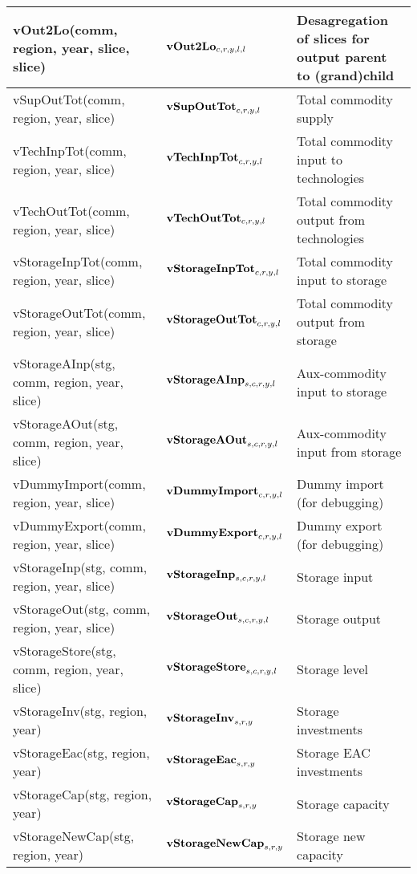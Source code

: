 \documentclass{article}
\begin{document}
\begin{longtable}{|p{10cm}|p{5cm}|p{9cm}|}
vOut2Lo(comm, region, year, slice, slice) & ${\bf vOut2Lo}_{c,r,y,l,l}$ & Desagregation of slices for output parent to (grand)child \\ 
 \hline
vSupOutTot(comm, region, year, slice) & ${\bf vSupOutTot}_{c,r,y,l}$ & Total commodity supply \\ 
 \hline
vTechInpTot(comm, region, year, slice) & ${\bf vTechInpTot}_{c,r,y,l}$ & Total commodity input to technologies \\ 
 \hline
vTechOutTot(comm, region, year, slice) & ${\bf vTechOutTot}_{c,r,y,l}$ & Total commodity output from technologies \\ 
 \hline
vStorageInpTot(comm, region, year, slice) & ${\bf vStorageInpTot}_{c,r,y,l}$ & Total commodity input to storage \\ 
 \hline
vStorageOutTot(comm, region, year, slice) & ${\bf vStorageOutTot}_{c,r,y,l}$ & Total commodity output from storage \\ 
 \hline
vStorageAInp(stg, comm, region, year, slice) & ${\bf vStorageAInp}_{s,c,r,y,l}$ & Aux-commodity input to storage \\ 
 \hline
vStorageAOut(stg, comm, region, year, slice) & ${\bf vStorageAOut}_{s,c,r,y,l}$ & Aux-commodity input from storage \\ 
 \hline
vDummyImport(comm, region, year, slice) & ${\bf vDummyImport}_{c,r,y,l}$ & Dummy import (for debugging) \\ 
 \hline
vDummyExport(comm, region, year, slice) & ${\bf vDummyExport}_{c,r,y,l}$ & Dummy export (for debugging) \\ 
 \hline
vStorageInp(stg, comm, region, year, slice) & ${\bf vStorageInp}_{s,c,r,y,l}$ & Storage input \\ 
 \hline
vStorageOut(stg, comm, region, year, slice) & ${\bf vStorageOut}_{s,c,r,y,l}$ & Storage output \\ 
 \hline
vStorageStore(stg, comm, region, year, slice) & ${\bf vStorageStore}_{s,c,r,y,l}$ & Storage level \\ 
 \hline
vStorageInv(stg, region, year) & ${\bf vStorageInv}_{s,r,y}$ & Storage investments \\ 
 \hline
vStorageEac(stg, region, year) & ${\bf vStorageEac}_{s,r,y}$ & Storage EAC investments \\ 
 \hline
vStorageCap(stg, region, year) & ${\bf vStorageCap}_{s,r,y}$ & Storage capacity \\ 
 \hline
vStorageNewCap(stg, region, year) & ${\bf vStorageNewCap}_{s,r,y}$ & Storage new capacity \\ 

\end{longtable}
\end{document}

